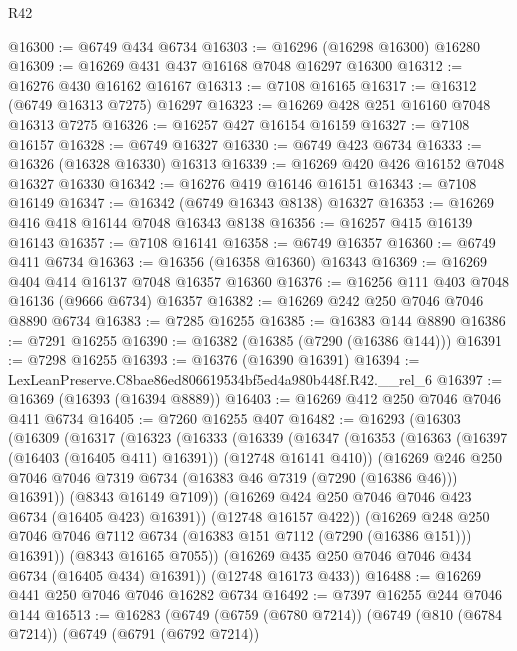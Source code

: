 \begin{lexlean}{R42}
\begin{coremodule}
{@16300 := @6749 @434 @6734
@16303 := @16296 (@16298 @16300) @16280
@16309 := @16269 @431 @437 @16168 @7048 @16297 @16300
@16312 := @16276 @430 @16162 @16167
@16313 := @7108 @16165
@16317 := @16312 (@6749 @16313 @7275) @16297
@16323 := @16269 @428 @251 @16160 @7048 @16313 @7275
@16326 := @16257 @427 @16154 @16159
@16327 := @7108 @16157
@16328 := @6749 @16327
@16330 := @6749 @423 @6734
@16333 := @16326 (@16328 @16330) @16313
@16339 := @16269 @420 @426 @16152 @7048 @16327 @16330
@16342 := @16276 @419 @16146 @16151
@16343 := @7108 @16149
@16347 := @16342 (@6749 @16343 @8138) @16327
@16353 := @16269 @416 @418 @16144 @7048 @16343 @8138
@16356 := @16257 @415 @16139 @16143
@16357 := @7108 @16141
@16358 := @6749 @16357
@16360 := @6749 @411 @6734
@16363 := @16356 (@16358 @16360) @16343
@16369 := @16269 @404 @414 @16137 @7048 @16357 @16360
@16376 := @16256 @111 @403 @7048 @16136 (@9666 @6734) @16357
@16382 := @16269 @242 @250 @7046 @7046 @8890 @6734
@16383 := @7285 @16255
@16385 := @16383 @144 @8890
@16386 := @7291 @16255
@16390 := @16382 (@16385 (@7290 (@16386 @144)))
@16391 := @7298 @16255
@16393 := @16376 (@16390 @16391)
@16394 := LexLeanPreserve.C8bae86ed806619534bf5ed4a980b448f.R42.__rel_6
@16397 := @16369 (@16393 (@16394 @8889))
@16403 := @16269 @412 @250 @7046 @7046 @411 @6734
@16405 := @7260 @16255 @407
@16482 := @16293
    (@16303
      (@16309
        (@16317
          (@16323
            (@16333
              (@16339
                (@16347
                  (@16353
                    (@16363 (@16397 (@16403 (@16405 @411) @16391)) (@12748 @16141 @410))
                    (@16269
                      @246
                      @250
                      @7046
                      @7046
                      @7319
                      @6734
                      (@16383 @46 @7319 (@7290 (@16386 @46)))
                      @16391))
                  (@8343 @16149 @7109))
                (@16269 @424 @250 @7046 @7046 @423 @6734 (@16405 @423) @16391))
              (@12748 @16157 @422))
            (@16269
              @248
              @250
              @7046
              @7046
              @7112
              @6734
              (@16383 @151 @7112 (@7290 (@16386 @151)))
              @16391))
          (@8343 @16165 @7055))
        (@16269 @435 @250 @7046 @7046 @434 @6734 (@16405 @434) @16391))
      (@12748 @16173 @433))
@16488 := @16269 @441 @250 @7046 @7046 @16282 @6734
@16492 := @7397 @16255 @244 @7046 @144
@16513 := @16283
    (@6749
      (@6759 (@6780 @7214))
      (@6749
        (@810 (@6784 @7214))
        (@6749
          (@6791 (@6792 @7214))
}
\end{coremodule}
\end{lexlean}

